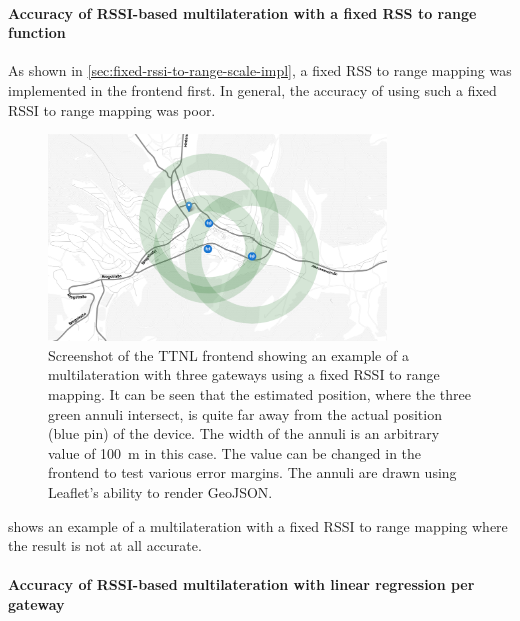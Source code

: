 \paragraph{Accuracy of \acs{RSSI}-based multilateration with a fixed \acs{RSS} to range function}\label{subsubsec:conclusion-rssi-fixed-scale}

As shown in \cref{sec:fixed-rssi-to-range-scale-impl}, a fixed \ac{RSS} to range mapping was implemented in the frontend first.
In general, the accuracy of using such a fixed \ac{RSSI} to range mapping was poor.

\begin{figure}[htbp]
    \centering
    \includegraphics[width=0.8\textwidth]{pictures/ttn-locator/frontend/multilateration/rssi_range_multilateration_bad_example.png}
    \caption{
        Screenshot of the \ac{TTNL} frontend showing an example of a multilateration with three gateways using a fixed \ac{RSSI} to range mapping.
        It can be seen that the estimated position, where the three green annuli intersect, is quite far away from the actual position (blue pin) of the device.
        The width of the annuli is an arbitrary value of \SI{100}{\meter} in this case.
        The value can be changed in the frontend to test various error margins.
        The annuli are drawn using Leaflet's ability to render GeoJSON.
    }\label{pic:bad-rssi-to-range-multilateration-example}
\end{figure}

 shows an example of a multilateration with a fixed \ac{RSSI} to range mapping where the result is not at all accurate.

\paragraph{Accuracy of \acs{RSSI}-based multilateration with linear regression per gateway}\label{subsubsec:conclusion-rssi-linear-regression}

